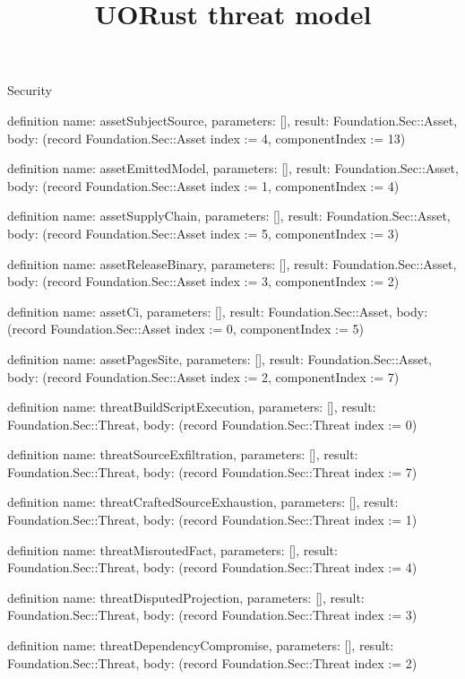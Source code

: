 \begin{lexlean}{Security}
\title{UORust threat model}
\begin{semanticmodule}
definition{
  name: assetSubjectSource,
  parameters: [],
  result: Foundation.Sec::Asset,
  body: (record Foundation.Sec::Asset {index := 4, componentIndex := 13})
}

definition{
  name: assetEmittedModel,
  parameters: [],
  result: Foundation.Sec::Asset,
  body: (record Foundation.Sec::Asset {index := 1, componentIndex := 4})
}

definition{
  name: assetSupplyChain,
  parameters: [],
  result: Foundation.Sec::Asset,
  body: (record Foundation.Sec::Asset {index := 5, componentIndex := 3})
}

definition{
  name: assetReleaseBinary,
  parameters: [],
  result: Foundation.Sec::Asset,
  body: (record Foundation.Sec::Asset {index := 3, componentIndex := 2})
}

definition{
  name: assetCi,
  parameters: [],
  result: Foundation.Sec::Asset,
  body: (record Foundation.Sec::Asset {index := 0, componentIndex := 5})
}

definition{
  name: assetPagesSite,
  parameters: [],
  result: Foundation.Sec::Asset,
  body: (record Foundation.Sec::Asset {index := 2, componentIndex := 7})
}

definition{
  name: threatBuildScriptExecution,
  parameters: [],
  result: Foundation.Sec::Threat,
  body: (record Foundation.Sec::Threat {index := 0})
}

definition{
  name: threatSourceExfiltration,
  parameters: [],
  result: Foundation.Sec::Threat,
  body: (record Foundation.Sec::Threat {index := 7})
}

definition{
  name: threatCraftedSourceExhaustion,
  parameters: [],
  result: Foundation.Sec::Threat,
  body: (record Foundation.Sec::Threat {index := 1})
}

definition{
  name: threatMisroutedFact,
  parameters: [],
  result: Foundation.Sec::Threat,
  body: (record Foundation.Sec::Threat {index := 4})
}

definition{
  name: threatDisputedProjection,
  parameters: [],
  result: Foundation.Sec::Threat,
  body: (record Foundation.Sec::Threat {index := 3})
}

definition{
  name: threatDependencyCompromise,
  parameters: [],
  result: Foundation.Sec::Threat,
  body: (record Foundation.Sec::Threat {index := 2})
}


\end{semanticmodule}
\end{lexlean}
